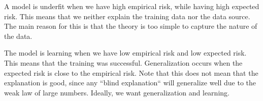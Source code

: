 A model is underfit when we have high empirical risk, while having high expected risk. This means
that we neither explain the training data nor the data source. The main reason for this is that the
theory is too simple to capture the nature of the data.

The model is learning when we have low empirical risk and low expected risk. This means that the training
was successful. Generalization occurs when the expected risk is close to the empirical risk. Note that 
this does not mean that the explanation is good, since any ``blind explanation`` will generalize well due
to the weak law of large numbers. Ideally, we want generalization and learning.
